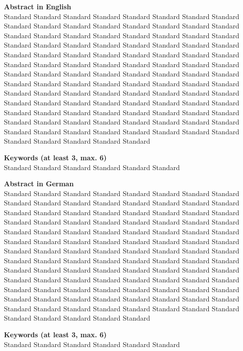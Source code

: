 
\newcommand*{\AbstractHead}[1]{%
{\noindent\color{header-blue}\Large\textbf{#1}}
\vspace{10pt}\\
}%

\newcommand*{\SomeSpace}{%
\vspace{\baselineskip}
}

\AbstractHead{Abstract in English}
\noindent
\normalsize
Standard Standard Standard Standard Standard Standard Standard Standard Standard Standard Standard Standard Standard Standard Standard Standard Standard Standard Standard Standard Standard Standard Standard Standard Standard Standard Standard Standard Standard Standard Standard Standard Standard Standard Standard Standard Standard Standard Standard Standard Standard Standard Standard Standard Standard Standard Standard Standard Standard Standard Standard Standard Standard Standard Standard Standard Standard Standard Standard Standard Standard Standard Standard Standard Standard Standard Standard Standard Standard Standard Standard Standard Standard Standard Standard Standard Standard Standard Standard Standard Standard Standard Standard Standard Standard Standard Standard Standard Standard Standard Standard Standard Standard Standard Standard Standard Standard Standard Standard Standard Standard Standard Standard Standard Standard Standard Standard Standard Standard 

\SomeSpace
\AbstractHead{Keywords (at least 3, max. 6)}
\normalsize
\noindent
Standard Standard Standard Standard Standard Standard

\SomeSpace

\AbstractHead{Abstract in German}
\noindent
\normalsize
Standard Standard Standard Standard Standard Standard Standard Standard Standard Standard Standard Standard Standard Standard Standard Standard Standard Standard Standard Standard Standard Standard Standard Standard Standard Standard Standard Standard Standard Standard Standard Standard Standard Standard Standard Standard Standard Standard Standard Standard Standard Standard Standard Standard Standard Standard Standard Standard Standard Standard Standard Standard Standard Standard Standard Standard Standard Standard Standard Standard Standard Standard Standard Standard Standard Standard Standard Standard Standard Standard Standard Standard Standard Standard Standard Standard Standard Standard Standard Standard Standard Standard Standard Standard Standard Standard Standard Standard Standard Standard Standard Standard Standard Standard Standard Standard Standard Standard Standard Standard Standard Standard Standard Standard Standard Standard Standard Standard Standard 

\SomeSpace
\AbstractHead{Keywords (at least 3, max. 6)}
\normalsize
\noindent
Standard Standard Standard Standard Standard Standard